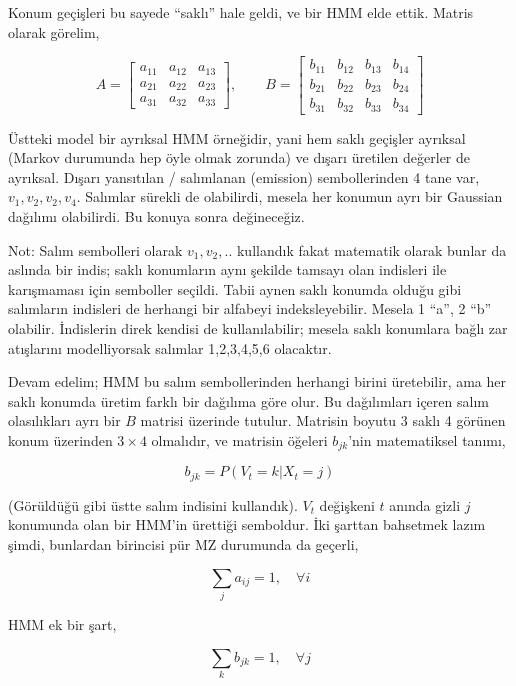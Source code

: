 \documentclass[12pt,fleqn]{article}\usepackage{../../common}
\begin{document}
Konum geçişleri bu sayede ``saklı'' hale geldi, ve bir HMM elde
ettik. Matris olarak görelim,

$$ 
A = \left[\begin{array}{rrr}
a_{11} & a_{12} & a_{13} \\
a_{21} & a_{22} & a_{23} \\
a_{31} & a_{32} & a_{33} 
\end{array}\right], \qquad
B = 
\left[\begin{array}{rrrr}
b_{11} & b_{12} & b_{13} & b_{14} \\
b_{21} & b_{22} & b_{23} & b_{24} \\
b_{31} & b_{32} & b_{33} & b_{34} 
\end{array}\right]
$$

Üstteki model bir ayrıksal HMM örneğidir, yani hem saklı geçişler
ayrıksal (Markov durumunda hep öyle olmak zorunda) ve dışarı üretilen
değerler de ayrıksal. Dışarı yansıtılan / salımlanan (emission)
sembollerinden 4 tane var, $v_1,v_2,v_2,v_4$. Salımlar sürekli de
olabilirdi, mesela her konumun ayrı bir Gaussian dağılımı olabilirdi. Bu
konuya sonra değineceğiz. 

Not: Salım sembolleri olarak $v_1,v_2,..$ kullandık fakat matematik olarak
bunlar da aslında bir indis; saklı konumların aynı şekilde tamsayı olan
indisleri ile karışmaması için semboller seçildi. Tabii aynen saklı konumda
olduğu gibi salımların indisleri de herhangi bir alfabeyi
indeksleyebilir. Mesela 1 ``a'', 2 ``b'' olabilir. İndislerin direk kendisi
de kullanılabilir; mesela saklı konumlara bağlı zar atışlarını
modelliyorsak salımlar 1,2,3,4,5,6 olacaktır.

Devam edelim; HMM bu salım sembollerinden herhangi birini üretebilir, ama
her saklı konumda üretim farklı bir dağılıma göre olur. Bu dağılımları
içeren salım olasılıkları ayrı bir $B$ matrisi üzerinde tutulur. Matrisin
boyutu 3 saklı 4 görünen konum üzerinden $3 \times 4$ olmalıdır, ve
matrisin öğeleri $b_{jk}$'nin matematiksel tanımı,

$$ 
b_{jk} =  P (V_t = k | X_t = j )
$$

(Görüldüğü gibi üstte salım indisini kullandık). $V_t$ değişkeni $t$ anında
gizli $j$ konumunda olan bir HMM'in ürettiği semboldur. İki şarttan
bahsetmek lazım şimdi, bunlardan birincisi pür MZ durumunda da geçerli,

$$ \sum_j a_{ij} = 1, \quad \forall i$$

HMM ek bir şart,

$$ \sum_k b_{jk} = 1, \quad \forall j $$
\end{document}

